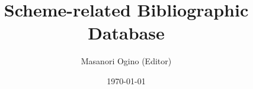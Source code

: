 \documentclass[a4paper]{article}
\title{Scheme-related Bibliographic Database}
\author{Masanori Ogino (Editor)}
\date{\today}
\begin{document}
\maketitle
\nocite{*}
\printbibliography
\end{document}
